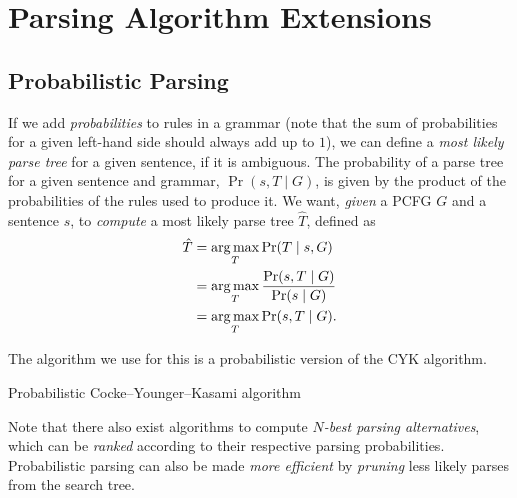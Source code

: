 \section{Parsing Algorithm Extensions}
\subsection{Probabilistic Parsing}
If we add \emph{probabilities} to rules in a grammar (note that the sum of probabilities for a given left-hand side should always add up to \(1\)), we can define a \emph{most likely parse tree} for a given sentence, if it is ambiguous.
The probability of a parse tree for a given sentence and grammar, \(\Pr(s, T \mid G)\), is given by the product of the probabilities of the rules used to produce it.
We want, \emph{given} a PCFG \(G\) and a sentence \(s\), to \emph{compute} a most likely parse tree \(\hat{T}\), defined as
\begin{align*}
\hat{T} &= \operatorname*{arg\,max}_{T} \Pr(T \mid s, G)\\
&= \operatorname*{arg\,max}_{T} \frac{\Pr(s, T \mid G)}{\Pr(s \mid G)}\\
&= \operatorname*{arg\,max}_{T} \Pr(s, T \mid G).
\end{align*}

The algorithm we use for this is a probabilistic version of the CYK algorithm.

\begin{algorithm}[H]
	\DontPrintSemicolon
	\SetAlgoLined
	\caption{Probabilistic Cocke--Younger--Kasami algorithm}
\end{algorithm}
Note that there also exist algorithms to compute \emph{\(N\)-best parsing alternatives}, which can be \emph{ranked} according to their respective parsing probabilities.
Probabilistic parsing can also be made \emph{more efficient} by \emph{pruning} less likely parses from the search tree.

